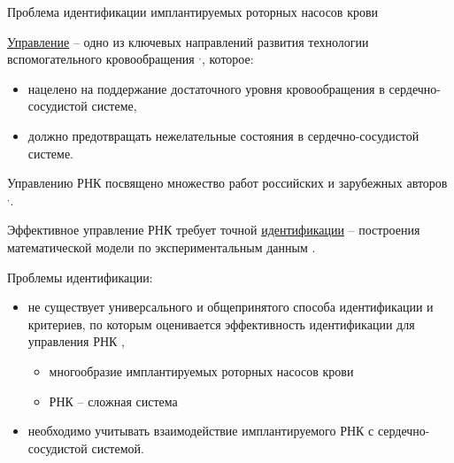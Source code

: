 \documentclass[a4paper, 9pt]{beamer}
\begin{document}
\begin{frame}{Проблема идентификации имплантируемых роторных насосов крови}
\small

\underline{Управление} -- одно из ключевых направлений развития технологии вспомогательного кровообращения \footnotemark[1]$^, $\footnotemark[2], которое: 
\vskip-5pt
\begin{itemize}
 \item \footnotesize нацелено на поддержание достаточного уровня кровообращения в сердечно-сосудистой системе,
 \item должно предотвращать нежелательные состояния в сердечно-сосудистой системе.
\end{itemize}

\footnotesize
\vskip-4pt
Управлению РНК посвящено множество работ российских и зарубежных авторов \footnotemark[1]$^, $\footnotemark[3]. 

\vskip-1pt
Эффективное управление РНК требует точной \underline{идентификации} -- построения математической модели по экспериментальным данным \footnotemark[4].

\vskip-2pt
Проблемы идентификации:
\vskip-6pt
\begin{itemize}
 \item \footnotesize не существует универсального и общепринятого способа идентификации и критериев, по которым оценивается эффективность идентификации для управления РНК \footnotemark[5],
 \begin{itemize}
  \item \footnotesize многообразие имплантируемых роторных насосов крови
  \item РНК -- сложная система \footnotemark[6]
 \end{itemize}
 \item необходимо учитывать взаимодействие имплантируемого РНК с сердечно-сосудистой системой.
\end{itemize}



\end{frame}
\end{document}
